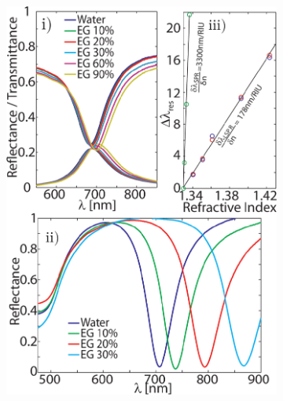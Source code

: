 \begin{figure}[t!]
\begin{minipage}[c]{.48\linewidth}
\end{minipage}		
		\begin{subfigure}{.01\linewidth}\caption{ }\label{sfig:resumenNDs} \vspace{9cm}	\end{subfigure} 
		\begin{subfigure}{.48\linewidth}\hspace{.5em}\includegraphics[scale=1.05]{0-4-Introduccion/figs/resumenND.png}\end{subfigure}		

\end{figure}

